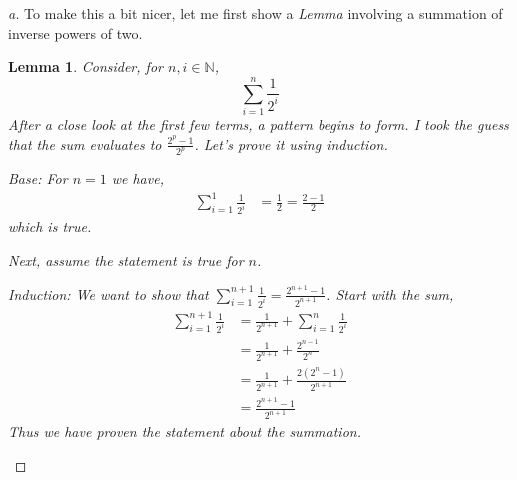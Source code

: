 \documentclass[leqno]{article}
\theoremstyle{nonumberplain}
\newtheorem{proof}{Proof}
\newtheorem{lemma}{Lemma}
\begin{document}
\begin{proof}[a]
To make this a bit nicer, let me first show a \emph{Lemma} involving a summation of inverse powers of two.  
\begin{lemma}
Consider, for $n,i \in \mathbb{N}$,
\[
\sum_{i=1}^{n} \frac{1}{2^i}
\]
After a close look at the first few terms, a pattern begins to form.  I took the guess that the sum evaluates to $\frac{2^p-1}{2^p}$.  Let's prove it using induction.

\vspace{5mm}

\emph{Base}: For $n=1$ we have, 
\begin{align*}
\sum_{i=1}^{1} \frac{1}{2^i} &= \frac{1}{2} = \frac{2-1}{2}
\end{align*}
which is true.

\vspace{5mm}

Next, assume the statement is true for $n$.  

\vspace{5mm}

\emph{Induction}: We want to show that $\sum_{i=1}^{n+1} \frac{1}{2^i} = \frac{2^{n+1}-1}{2^{n+1}}$. Start with the sum,
\begin{align*}
\sum_{i=1}^{n+1} \frac{1}{2^i} &= \frac{1}{2^{n+1}}+\sum_{i=1}^{n} \frac{1}{2^i}\\
&= \frac{1}{2^{n+1}} + \frac{2^{n-1}}{2^n}\\
&= \frac{1}{2^{n+1}} + \frac{2(2^n-1)}{2^{n+1}}\\
&= \frac{2^{n+1}-1}{2^{n+1} }
\end{align*}
Thus we have proven the statement about the summation.
\end{lemma}

\vspace{5mm}


\end{proof}
\end{document}
